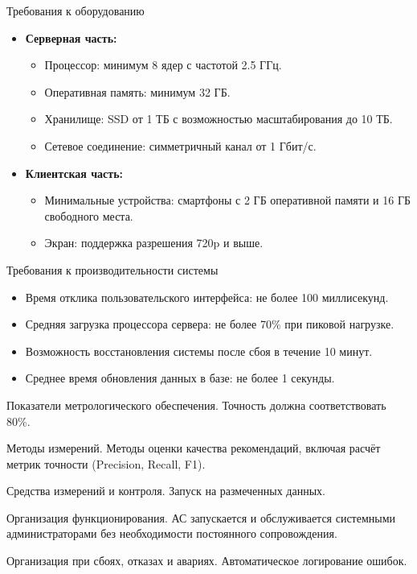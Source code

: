 Требования к оборудованию
\begin{itemize}
	\item \textbf{Серверная часть:}
	\begin{itemize}
		\item Процессор: минимум 8 ядер с частотой 2.5 ГГц.
		\item Оперативная память: минимум 32 ГБ.
		\item Хранилище: SSD от 1 ТБ с возможностью масштабирования до 10 ТБ.
		\item Сетевое соединение: симметричный канал от 1 Гбит/с.
	\end{itemize}
	\item \textbf{Клиентская часть:}
	\begin{itemize}
		\item Минимальные устройства: смартфоны с 2 ГБ оперативной памяти и 16 ГБ свободного места.
		\item Экран: поддержка разрешения 720p и выше.
	\end{itemize}
\end{itemize}

Требования к производительности системы
\begin{itemize}
	\item Время отклика пользовательского интерфейса: не более 100 миллисекунд.
	\item Средняя загрузка процессора сервера: не более 70\% при пиковой нагрузке.
	\item Возможность восстановления системы после сбоя в течение 10 минут.
	\item Среднее время обновления данных в базе: не более 1 секунды.
\end{itemize}


Показатели метрологического обеспечения.
Точность  должна соответствовать 80\%.

Методы измерений.
Методы оценки качества рекомендаций, включая расчёт метрик точности (Precision, Recall, F1).

Средства измерений и контроля.
Запуск на размеченных данных.


Организация функционирования.
АС запускается и обслуживается системными администраторами
без необходимости постоянного сопровождения.

Организация при сбоях, отказах и авариях.
Автоматическое логирование ошибок.

